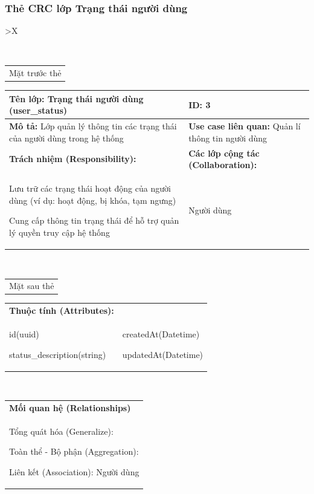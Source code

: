 \subsubsection{Thẻ CRC lớp Trạng thái người dùng}

\begin{xltabular}{\textwidth}{
		>{\centering\arraybackslash}X
	}
	\caption{\bfseries \fontsize{12pt}{0pt}\selectfont Thẻ CRC lớp Trạng thái người dùng}
	\\
	\begin{tabularx}{0.9\textwidth}{X}
		Mặt trước thẻ
	\end{tabularx}
	\begin{tabularx}{0.9\textwidth}{|X|X|}
		\hline
		\textbf{Tên lớp:} Trạng thái người dùng (user\_status)                             & \textbf{ID:} 3                                             \\
		\hline
		\textbf{Mô tả:} Lớp quản lý thông tin các trạng thái của người dùng trong hệ thống & \textbf{Use case liên quan:}  Quản lí thông tin người dùng \\
		\hline
		\textbf{Trách nhiệm (Responsibility):}                                             & \textbf{Các lớp cộng tác (Collaboration):}                 \\
		Lưu trữ các trạng thái hoạt động của người dùng (ví dụ: hoạt động, bị khóa, tạm ngưng)

		Cung cấp thông tin trạng thái để hỗ trợ quản lý quyền truy cập hệ thống
		                                                                                   &
		Người dùng
		\\
		\hline
	\end{tabularx}
	\\
	\begin{tabularx}{0.9\textwidth}{X}
		Mặt sau thẻ
	\end{tabularx}
	\begin{tabularx}{0.9\textwidth}{|X|X|}
		\hline
		\textbf{Thuộc tính (Attributes):} & \\
		id(uuid)

		status\_description(string)
		                                  &
		createdAt(Datetime)

		updatedAt(Datetime)
		\\ \hline
	\end{tabularx}
	\\
	\begin{tabularx}{0.9\textwidth}{|X|}
		\hline
		\textbf{Mối quan hệ (Relationships)} \\
		Tổng quát hóa (Generalize):

		Toàn thể - Bộ phận (Aggregation):

		Liên kết (Association): Người dùng
		\\
		\hline
	\end{tabularx}
\end{xltabular}

